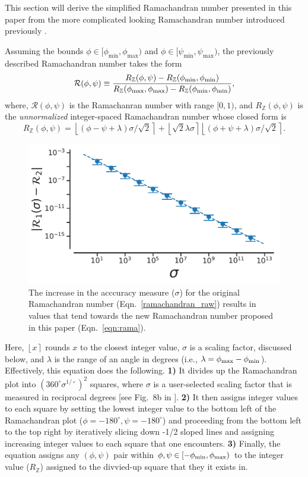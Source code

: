 \documentclass[fleqn,10pt,lineno]{wlpeerj} %
\newcommand{\round}[1]{\left \lfloor #1 \right \rceil }
\newcommand{\Eqn}[1]{Eqn.~\ref{#1}}
\begin{document}
This section will derive the simplified Ramachandran number presented in this paper from the more complicated looking Ramachandran number introduced previously \citep{Mannige2016}. 

Assuming the bounds $\phi \in [\phi_\textrm{min},\phi_\textrm{max})$ and  $\phi \in [\psi_\textrm{min},\psi_\textrm{max})$, the previously described Ramachandran number takes the form 
\begin{equation}
{\mathcal{R}}(\phi,\psi) \equiv  \frac{R_\mathbb{Z}(\phi,\psi)-R_{\mathbb{Z}}(\phi_{\rm{min}},\phi_{\rm{min}})}
{R_{\mathbb{Z}}(\phi_{\rm{max}},\phi_{\rm{max}})-R_{\mathbb{Z}}(\phi_{\rm{min}},\phi_{\rm{min}})},\label{rama}
\end{equation}
where, $\mathcal{R}(\phi,\psi)$ is the Ramachanran number with range $[0,1)$, and $R_\mathbb{Z}(\phi,\psi)$ is the {\it unnormalized} integer-spaced Ramachandran number whose closed form is
\begin{equation}
R_\mathbb{Z}(\phi,\psi)  = \round{(\phi - \psi + \lambda)\sigma/\sqrt{2}}  + \round{\sqrt{2} \lambda\sigma} \round{(\phi+\psi + \lambda)\sigma/\sqrt{2}}.\label{ramachandran_raw}
\end{equation}

\begin{figure}[b!]
\centering
\includegraphics[width=0.6\linewidth]{automated_figures/fig_R_vs_R2.pdf}
\caption{The increase in the acccuracy measure ($\sigma$) for the original Ramachandran number (\Eqn{ramachandran_raw}) results in values that tend towards the new Ramachandran number proposed in this paper (\Eqn{eqn:rama}).\label{fig:sigma}} 
\end{figure} 

Here, $\round{x}$ rounds $x$ to the closest integer value, $\sigma$ is a scaling factor, discussed below, and $\lambda$ is the range of an angle in degrees (i.e., $\lambda=\phi_{\rm max}-\phi_{\rm min}$). Effectively, this equation does the following. \textbf{1)} It divides up the Ramachandran plot into $(360^\circ \sigma^{1/\circ})^2$  squares, where $\sigma$ is a user-selected scaling factor that is measured in reciprocal degrees [see Fig.~8b in \cite{Mannige2016}]. \textbf{2)} It then assigns integer values to each square by setting the lowest integer value to the bottom left of the Ramachandran plot ($\phi=-180^\circ,\psi=-180^\circ$) and proceeding from the bottom left to the top right by iteratively slicing down -1/2 sloped lines and assigning increasing integer values to each square that one encounters. \textbf{3)} Finally, the equation assigns any $(\phi,\psi)$ pair within $\phi,\psi \in [-\phi_{\rm min},\phi_{\rm max})$ to the integer value ($R_\mathbb{Z}$) assigned to the divvied-up square that they it exists in.
\end{document}
